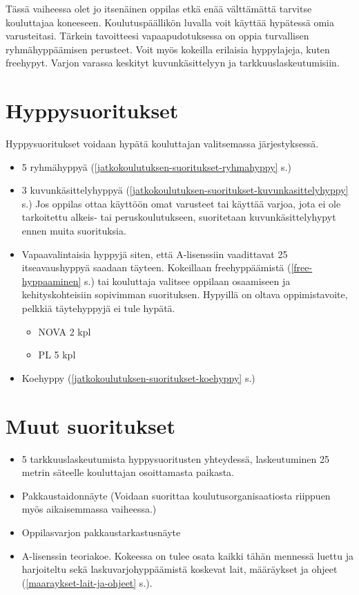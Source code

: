 
Tässä vaiheessa olet jo itsenäinen oppilas etkä enää välttämättä tarvitse kouluttajaa koneeseen. Koulutuspäällikön luvalla voit käyttää hypätessä omia varusteitasi. Tärkein tavoitteesi vapaapudotuksessa on oppia turvallisen ryhmähyppäämisen perusteet. Voit myös kokeilla erilaisia hyppylajeja, kuten freehypyt. Varjon varassa keskityt kuvunkäsittelyyn ja tarkkuuslaskeutumisiin. 

\section{ Hyppysuoritukset }
\label{yhteenveto-jatkokoulutus-hyppysuoritukset}


Hyppysuoritukset voidaan hypätä kouluttajan valitsemassa järjestyksessä. 

\begin{itemize}
\item  5 ryhmähyppyä (\ref{jatkokoulutuksen-suoritukset-ryhmahyppy} s.\pageref{jatkokoulutuksen-suoritukset-ryhmahyppy}) 
\item  3 kuvunkäsittelyhyppyä (\ref{jatkokoulutuksen-suoritukset-kuvunkasittelyhyppy} s.\pageref{jatkokoulutuksen-suoritukset-kuvunkasittelyhyppy}) Jos oppilas ottaa käyttöön omat varusteet tai käyttää varjoa, jota ei ole tarkoitettu alkeis- tai peruskoulutukseen, suoritetaan kuvunkäsittelyhypyt ennen muita suorituksia. 
\item  Vapaavalintaisia hyppyjä siten, että A-lisenssiin vaadittavat 25 itseavaushyppyä saadaan täyteen. Kokeillaan freehyppäämistä (\ref{free-hyppaaminen} s.\pageref{free-hyppaaminen}) tai kouluttaja valitsee oppilaan osaamiseen ja kehityskohteisiin sopivimman suorituksen. Hypyillä on oltava oppimistavoite, pelkkiä täytehyppyjä ei tule hypätä. 
	\begin{itemize}
	\item  NOVA 2 kpl 
	\item  PL 5 kpl 
	\end{itemize}
\item  Koehyppy (\ref{jatkokoulutuksen-suoritukset-koehyppy} s.\pageref{jatkokoulutuksen-suoritukset-koehyppy}) 
\end{itemize}
\section{ Muut suoritukset }
\label{yhteenveto-jatkokoulutus-muut-suoritukset}

\begin{itemize}
\item  5 tarkkuuslaskeutumista hyppysuoritusten yhteydessä, laskeutuminen 25 metrin säteelle kouluttajan osoittamasta paikasta. 
\item  Pakkaustaidonnäyte (Voidaan suorittaa koulutusorganisaatiosta riippuen myös aikaisemmassa vaiheessa.) 
\item  Oppilasvarjon pakkaustarkastusnäyte 
\item  A-lisenssin teoriakoe. Kokeessa on tulee osata kaikki tähän mennessä luettu ja harjoiteltu sekä laskuvarjohyppäämistä koskevat lait, määräykset ja ohjeet (\ref{maaraykset-lait-ja-ohjeet} s.\pageref{maaraykset-lait-ja-ohjeet}). 
\end{itemize}
